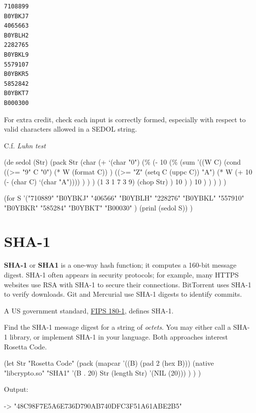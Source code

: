 \begin{verbatim}
7108899
B0YBKJ7
4065663
B0YBLH2
2282765
B0YBKL9
5579107
B0YBKR5
5852842
B0YBKT7
B000300
\end{verbatim}

For extra credit, check each input is correctly formed, especially with
respect to valid characters allowed in a SEDOL string.

C.f. \emph{Luhn test}


\begin{wideverbatim}

(de sedol (Str)
   (pack Str
      (char
         (+ `(char "0")
            (\%
               (- 10
                  (\%
                     (sum
                        '((W C)
                           (cond
                              ((>= "9" C "0")
                                 (* W (format C)) )
                              ((>= "Z" (setq C (uppc C)) "A")
                                 (* W (+ 10 (- (char C) `(char "A")))) ) ) )
                        (1 3 1 7 3 9)
                        (chop Str) )
                     10 ) )
               10 ) ) ) ) )

(for S '("710889" "B0YBKJ" "406566" "B0YBLH" "228276" "B0YBKL"
           "557910" "B0YBKR" "585284" "B0YBKT" "B00030" )
   (prinl (sedol S)) )

\end{wideverbatim}

\pagebreak{}
\section*{SHA-1}

\textbf{SHA-1} or \textbf{SHA1} is a one-way hash function; it computes
a 160-bit message digest. SHA-1 often appears in security protocols; for
example, many HTTPS websites use RSA with SHA-1 to secure their
connections. BitTorrent uses SHA-1 to verify downloads. Git and
Mercurial use SHA-1 digests to identify commits.

A US government standard,
\href{http://www.itl.nist.gov/fipspubs/fip180-1.htm}{FIPS 180-1},
defines SHA-1.

Find the SHA-1 message digest for a string of
\emph{octets}. You may either call a SHA-1 library, or
implement SHA-1 in your language. Both approaches interest Rosetta Code.


\begin{wideverbatim}

(let Str "Rosetta Code"
   (pack
      (mapcar '((B) (pad 2 (hex B)))
         (native "libcrypto.so" "SHA1" '(B . 20) Str (length Str) '(NIL (20))) ) ) )

Output:

-> "48C98F7E5A6E736D790AB740DFC3F51A61ABE2B5"

\end{wideverbatim}

